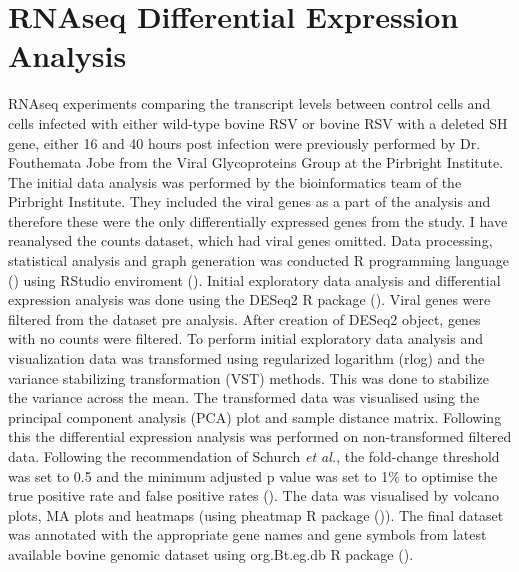 \section{RNAseq Differential Expression Analysis} \label{sec:RNAseq Differential Expression Analysis}
RNAseq experiments comparing the transcript levels between control cells and cells infected with either wild-type bovine RSV or bovine RSV with a deleted SH gene, either 16 and 40 hours post infection were previously performed by Dr. Fouthemata Jobe from the Viral Glycoproteins Group at the Pirbright Institute. The initial data analysis was performed by the bioinformatics team of the Pirbright Institute. They included the viral genes as a part of the analysis and therefore these were the only differentially expressed genes from the study. I have reanalysed the counts dataset, which had viral genes omitted. Data processing, statistical analysis and graph generation was conducted R programming language (\cite{RCoreTeam2022R:Computing}) using RStudio enviroment (\cite{RStudioTeam2022RStudio:RStudio}). Initial exploratory data analysis and differential expression analysis was done using the DESeq2 R package (\cite{Love2014ModeratedDESeq2}). Viral genes were filtered from the dataset pre analysis. After creation of DESeq2 object, genes with no counts were filtered. To perform initial exploratory data analysis and visualization data was transformed using regularized logarithm (rlog) and the variance stabilizing transformation (VST) methods. This was done to stabilize the variance across the mean. The transformed data was visualised using the principal component analysis (PCA) plot and sample distance matrix. Following this the differential expression analysis was performed on non-transformed filtered data. Following the recommendation of Schurch \textit{et al.}, the fold-change threshold was set to 0.5 and the minimum adjusted p value was set to 1\% to optimise the true positive rate and false positive rates (\cite{Schurch2016HowUse}). The data was visualised by volcano plots, MA plots and heatmaps (using pheatmap R package (\cite{Kolde2019Pheatmap:Heatmaps})). The final dataset was annotated with the appropriate gene names and gene symbols from latest available bovine genomic dataset using org.Bt.eg.db R package (\cite{Carlson2022Org.Bt.eg.db:Bovine}).




